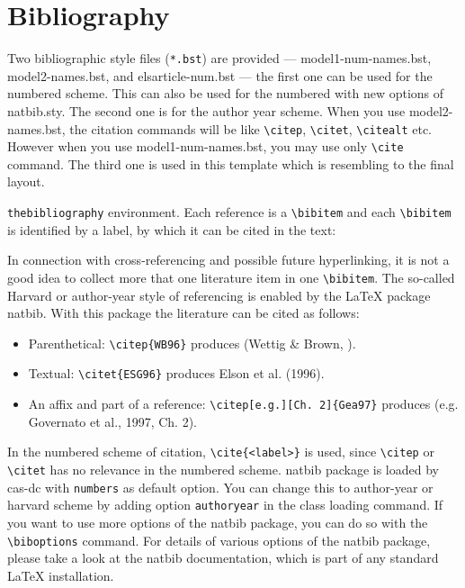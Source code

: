 \documentclass[a4paper,fleqn]{cas-dc}
\begin{document}
\section{Bibliography}

Two bibliographic style files (\verb+*.bst+) are provided ---
{model1-num-names.bst}, {model2-names.bst}, and {elsarticle-num.bst} --- the first one can be
used for the numbered scheme. This can also be used for the numbered
with new options of {natbib.sty}. The second one is for the author year
scheme. When you use model2-names.bst, the citation commands will be
like \verb+\citep+,  \verb+\citet+, \verb+\citealt+ etc. However when
you use model1-num-names.bst, you may use only \verb+\cite+ command. The third one is 
used in this template which is resembling to the final layout.

\verb+thebibliography+ environment. Each reference is a \linebreak
\verb+\bibitem+ and each \verb+\bibitem+ is identified by a label,
by which it can be cited in the text:

\noindent In connection with cross-referencing and
possible future hyperlinking, it is not a good idea to collect
more that one literature item in one \verb+\bibitem+. The
so-called Harvard or author-year style of referencing is enabled
by the \LaTeX{} package {natbib}. With this package the
literature can be cited as follows:

\begin{itemize}
\itemsep=-1pt 		%
\itemindent=-3pt 	%
\item Parenthetical: \verb+\citep{WB96}+ produces (Wettig \& Brown, ).
\item Textual: \verb+\citet{ESG96}+ produces Elson et al. (1996).
\item An affix and part of a reference: %
\verb+\citep[e.g.][Ch. 2]{Gea97}+ produces (e.g. Governato et
al., 1997, Ch. 2).
\end{itemize}

In the numbered scheme of citation, \verb+\cite{<label>}+ is used,
since \verb+\citep+ or \verb+\citet+ has no relevance in the numbered
scheme. {natbib} package is loaded by {cas-dc} with
\verb+numbers+ as default option. You can change this to author-year
or harvard scheme by adding option \verb+authoryear+ in the class
loading command. If you want to use more options of the {natbib}
package, you can do so with the \verb+\biboptions+ command. For
details of various options of the {natbib} package, please take a
look at the {natbib} documentation, which is part of any standard
\LaTeX{} installation.
\end{document}
